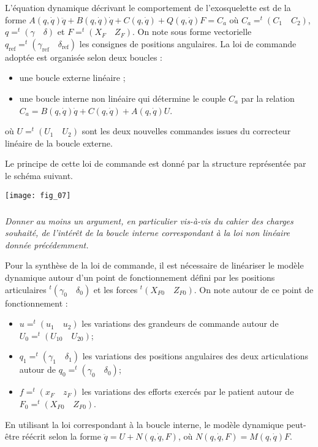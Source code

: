 \begin{multicols}{2}
L’équation dynamique décrivant le comportement de l’exosquelette est de la forme 
$A(q, \dot{q})\ddot{q}+ B(q, \dot{q})\dot{q} + C(q, \dot{q}) + Q(q, \dot{q}) F = C_a$ 
où $C_a = ^t(C_1\quad C_2)$, $q = ^t(\gamma \quad \delta)$ et $F = ^t(X_F \quad Z_F )$. On note sous forme vectorielle $q_{\text{ref}} = ^t(\gamma_{\text{ref}} \quad \delta_{\text{ref}})$ les consignes
de positions angulaires. La loi de commande adoptée est organisée selon deux boucles :
\begin{itemize}
\item une boucle externe linéaire ;
\item une boucle interne non linéaire qui détermine le couple $C_a$ par la relation
$C_a = B(q, \dot{q})\dot{q} + C(q, \dot{q}) + A(q, \dot{q}) U$.
\end{itemize}
où $U = ^t(U_1 \quad U_2)$ sont les deux nouvelles commandes issues du correcteur linéaire de la boucle externe.

Le principe de cette loi de commande est donné par la structure représentée par le schéma suivant.

\begin{center}
\texttt{[image: fig\_07]}
\end{center}


\subparagraph{}
\textit{Donner au moins un argument, en particulier vis-à-vis du cahier des charges souhaité, de l’intérêt de la
boucle interne correspondant à la loi non linéaire donnée précédemment.}

Pour la synthèse de la loi de commande, il est nécessaire de linéariser le modèle dynamique autour d’un point
de fonctionnement défini par les positions articulaires $ ^t(\gamma_0 \quad \delta_0)$ et les forces $ ^t\left(X_{F0}\quad Z_{F0}\right)$. On note autour de ce point de fonctionnement :
\begin{itemize}
\item $ u = ^t\left(u_1\quad u_2\right)$ les variations des grandeurs de commande autour de $ U_0 = ^t\left(U_{10}\quad U_{20}\right)$;
\item $q_1 = ^t\left(\gamma_1 \quad \delta_1\right)$ les variations des positions angulaires des deux articulations autour de $q_0 = ^t\left(\gamma_0 \quad \delta_0\right)$;
\item $ f = ^t\left(x_F \quad z_F \right)$ les variations des efforts exercés par le patient autour de $F_0 =  ^t\left(X_{F0} \quad Z_{F0} \right)$.
\end{itemize}
En utilisant la loi correspondant à la boucle interne, le modèle dynamique peut-être réécrit selon la forme
$\ddot{q}= U + N\left(q, \dot{q}, F\right)$, où $N\left(q, \dot{q}, F\right) = M\left(q, \dot{q}\right) F$.




\end{multicols}
